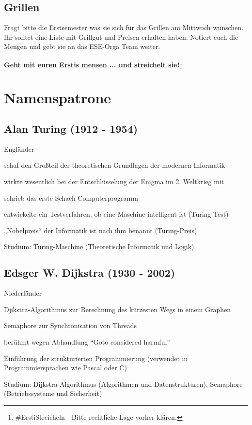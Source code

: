 \documentclass[a4paper,12pt]{report}
\begin{document}
\section{Grillen}
Fragt bitte die Erstsemester was sie sich für das Grillen am Mittwoch wünschen. Ihr solltet eine Liste mit Grillgut und Preisen erhalten haben. Notiert euch die Mengen und gebt sie an das ESE-Orga Team weiter.


\bigskip
\bigskip
\begin{center}
\huge{\textbf{Geht mit euren Erstis mensen ... und streichelt sie!}}\footnote[42]{\#ErstiStreicheln - Bitte rechtliche Lage vorher klären.}
\end{center}
\chapter{Namenspatrone}
\section*{Alan Turing (1912 - 1954)}
\begin{itemize*}
    \item Engländer
    \item schuf den Großteil der theoretischen Grundlagen der modernen Informatik
    \item wirkte wesentlich bei der Entschlüsselung der Enigma im 2. Weltkrieg mit
    \item schrieb das erste Schach-Computerprogramm
    \item entwickelte ein Testverfahren, ob eine Maschine intelligent ist (Turing-Test)
    \item „Nobelpreis“ der Informatik ist nach ihm benannt (Turing-Preis)
    \item Studium: Turing-Maschine (Theoretische Informatik und Logik)
\end{itemize*}

\section*{Edsger W. Dijkstra (1930 - 2002)}
\begin{itemize*}
    \item Niederländer
    \item Djikstra-Algorithmus zur Berechnung des kürzesten Wegs in einem Graphen
    \item Semaphore zur Synchronisation von Threads
    \item berühmt wegen Abhandlung ``Goto considered harmful''
    \item Einführung der strukturierten Programmierung (verwendet in Programmiersprachen wie
          Pascal oder C)
    \item Studium: Dijkstra-Algorithmus (Algorithmen und Datenstrukturen), Semaphore
          (Betriebssysteme und Sicherheit)
\end{itemize*}
\end{document}
